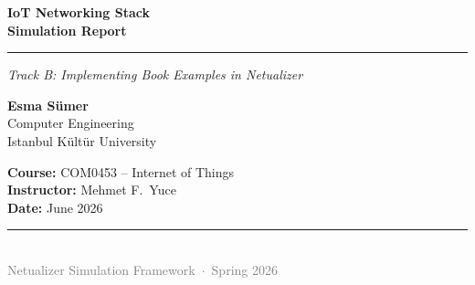 \documentclass[12pt,a4paper]{article}
\begin{document}
\begin{titlepage}
  \centering
  \vspace*{1.2cm}
  {\Huge\bfseries\color{darkblue} IoT Networking Stack\\[0.4em] Simulation Report}
  \vspace{0.5cm}
  \rule{0.75\linewidth}{1.2pt}
  \vspace{0.4cm}

  {\large\itshape Track B: Implementing Book Examples in Netualizer}

  \vspace{2cm}

  {\Large\textbf{Esma S\"umer}}\\[0.4em]
  {\normalsize Computer Engineering\\Istanbul K\"ult\"ur University}

  \vspace{1.2cm}
  {\normalsize
    \textbf{Course:} COM0453 -- Internet of Things\\[0.2em]
    \textbf{Instructor:} Mehmet F.\ Yuce\\[0.2em]
    \textbf{Date:} June 2026
  }

  \vfill
  \rule{0.75\linewidth}{0.5pt}\\[0.3em]
  {\small\textcolor{gray}{Netualizer Simulation Framework~$\cdot$~Spring 2026}}
\end{titlepage}

\tableofcontents
\newpage

\begin{abstract}
\noindent
This report documents the design, implementation, and analysis of seven IoT
networking protocol scenarios executed within the \textbf{Netualizer}
simulation environment as part of the COM0453 Internet of Things course
(Track~B). Five foundational protocols --- TCP, MQTT, CoAP, UDP, and mDNS ---
are implemented, each documented with its theoretical background, Netualizer
architecture diagram, Lua source code walkthrough, console output, and
engineering analysis. Two additional scenarios cover data logging with
high-resolution timestamps and deliberate multi-layer failure injection.
A comparative protocol matrix and a security threat overview conclude the
report. All experiments are fully reproducible within Netualizer without
external hardware.
\end{abstract}
\end{document}
